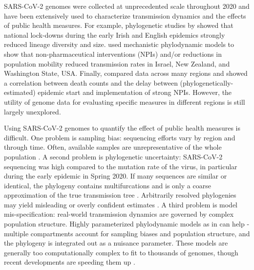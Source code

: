 \documentclass[9pt,twocolumn,twoside,lineno]{pnas-new}
\begin{document}
SARS-CoV-2 genomes were collected at unprecedented scale throughout 2020 \cite{Alm2020} and have been extensively used to characterize transmission dynamics and the effects of public health measures. For example, phylogenetic studies by \cite{Mallon2020, duPlessis2021} showed that national lock-downs during the early Irish and English epidemics  strongly reduced lineage diversity and size. \cite{Miller2020, Geoghegan2020a, Muller2020a} used mechanistic phylodynamic models to show that non-pharmaceutical interventions (NPIs) and/or reductions in population mobility reduced transmission rates in Israel, New Zealand, and Washington State, USA. Finally, \cite{Ragonnet-Cronin2021} compared data across many regions and showed a correlation between death counts and the delay between (phylogenetically-estimated) epidemic start and implementation of strong NPIs. However, the utility of genome data for evaluating specific measures in different regions is still largely unexplored.


Using SARS-CoV-2 genomes to quantify the effect of public health measures is difficult. One problem is sampling bias: sequencing efforts vary by region and through time. Often, available samples are unrepresentative of the whole population \cite{Villabona-Arenas2020, DeMaio2015}. A second problem is phylogenetic uncertainty: SARS-CoV-2 sequencing was high compared to the mutation rate of the virus, in particular during the early epidemic in Spring 2020. If many sequences are similar or identical, the phylogeny contains multifurcations and is only a coarse approximation of the true transmission tree \cite{Villabona-Arenas2020}. Arbitrarily resolved phylogenies may yield misleading or overly confident estimates \cite{Morel2021}. A third problem is model mis-specification: real-world transmission dynamics are governed by complex population structure. Highly parameterized phylodynamic models as in \cite{Miller2020, Geoghegan2020a, Muller2020a} can help - multiple compartments account for sampling biases and population structure, and the phylogeny is integrated out as a nuisance parameter. These models are generally too computationally complex to fit to thousands of genomes, though recent developments are speeding them up \cite{Lemey2021}. 
\end{document}
